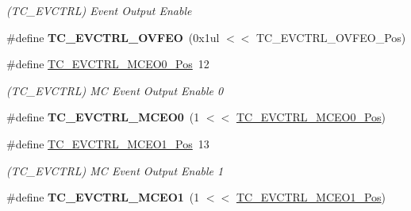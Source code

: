 \begin{DoxyCompactItemize}
\begin{DoxyCompactList}\small\item\em (T\+C\+\_\+\+E\+V\+C\+T\+R\+L) Event Output Enable \end{DoxyCompactList}\item 
\hypertarget{group___s_a_m_l21___t_c_ga3f47b22a4764e14911649d4ed5379ddc}{}\#define {\bfseries T\+C\+\_\+\+E\+V\+C\+T\+R\+L\+\_\+\+O\+V\+F\+E\+O}~(0x1ul $<$$<$ T\+C\+\_\+\+E\+V\+C\+T\+R\+L\+\_\+\+O\+V\+F\+E\+O\+\_\+\+Pos)\label{group___s_a_m_l21___t_c_ga3f47b22a4764e14911649d4ed5379ddc}

\item 
\hypertarget{group___s_a_m_l21___t_c_gabf0dbad463b5bb2ba2408c7741608af1}{}\#define \hyperlink{group___s_a_m_l21___t_c_gabf0dbad463b5bb2ba2408c7741608af1}{T\+C\+\_\+\+E\+V\+C\+T\+R\+L\+\_\+\+M\+C\+E\+O0\+\_\+\+Pos}~12\label{group___s_a_m_l21___t_c_gabf0dbad463b5bb2ba2408c7741608af1}

\begin{DoxyCompactList}\small\item\em (T\+C\+\_\+\+E\+V\+C\+T\+R\+L) M\+C Event Output Enable 0 \end{DoxyCompactList}\item 
\hypertarget{group___s_a_m_l21___t_c_gaa74033bba9d65fd685b503f9ea66675f}{}\#define {\bfseries T\+C\+\_\+\+E\+V\+C\+T\+R\+L\+\_\+\+M\+C\+E\+O0}~(1 $<$$<$ \hyperlink{group___s_a_m_l21___t_c_gabf0dbad463b5bb2ba2408c7741608af1}{T\+C\+\_\+\+E\+V\+C\+T\+R\+L\+\_\+\+M\+C\+E\+O0\+\_\+\+Pos})\label{group___s_a_m_l21___t_c_gaa74033bba9d65fd685b503f9ea66675f}

\item 
\hypertarget{group___s_a_m_l21___t_c_ga17ba305f7c87565868668e0aec74b48c}{}\#define \hyperlink{group___s_a_m_l21___t_c_ga17ba305f7c87565868668e0aec74b48c}{T\+C\+\_\+\+E\+V\+C\+T\+R\+L\+\_\+\+M\+C\+E\+O1\+\_\+\+Pos}~13\label{group___s_a_m_l21___t_c_ga17ba305f7c87565868668e0aec74b48c}

\begin{DoxyCompactList}\small\item\em (T\+C\+\_\+\+E\+V\+C\+T\+R\+L) M\+C Event Output Enable 1 \end{DoxyCompactList}\item 
\hypertarget{group___s_a_m_l21___t_c_gae89ffea0c2e929379331ff3eb8e14ea1}{}\#define {\bfseries T\+C\+\_\+\+E\+V\+C\+T\+R\+L\+\_\+\+M\+C\+E\+O1}~(1 $<$$<$ \hyperlink{group___s_a_m_l21___t_c_ga17ba305f7c87565868668e0aec74b48c}{T\+C\+\_\+\+E\+V\+C\+T\+R\+L\+\_\+\+M\+C\+E\+O1\+\_\+\+Pos})\label{group___s_a_m_l21___t_c_gae89ffea0c2e929379331ff3eb8e14ea1}


\end{DoxyCompactItemize}
